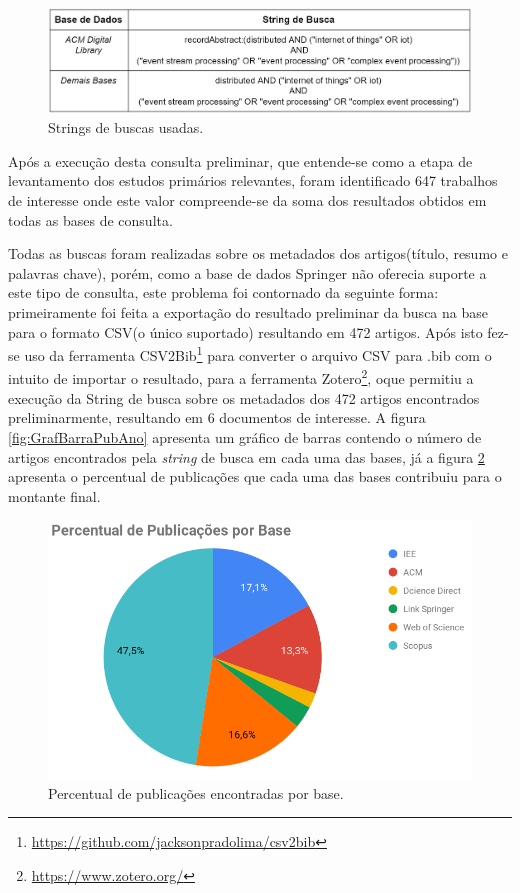 \documentclass[ti,table]{texufpel} %
\begin{document}
\begin{figure}[ht]
	\centering
	\includegraphics[width=1\textwidth]{imagens/tabela_string_busca.png}
	\caption{Strings de buscas usadas.}
	\label{tab:stringBusca}
\end{figure}

Após a execução desta consulta preliminar, que entende-se como a etapa de levantamento dos estudos primários relevantes, foram identificado 647 trabalhos de interesse onde este valor  compreende-se da soma dos resultados obtidos em todas as bases de consulta.

Todas as buscas foram realizadas sobre os metadados dos artigos(título, resumo e palavras chave), porém, como a base de dados Springer não oferecia suporte a este tipo de consulta, este problema foi contornado da seguinte forma: primeiramente foi feita a exportação do resultado preliminar da busca na base para o formato CSV(o único suportado) resultando em 472 artigos. Após isto fez-se uso da ferramenta CSV2Bib\footnote{\url{https://github.com/jacksonpradolima/csv2bib}} para converter o arquivo CSV para .bib com o intuito de importar o resultado, para a ferramenta Zotero\footnote{\url{https://www.zotero.org/}}, oque permitiu a execução da String de busca sobre os metadados dos 472 artigos encontrados preliminarmente, resultando em 6 documentos de interesse. A figura  \ref{fig:GrafBarraPubAno} apresenta um gráfico de barras contendo o número de artigos encontrados pela \textit{string} de busca em cada uma das bases, já a figura \ref{fig:GrafPizPubAno} apresenta o percentual de publicações que cada uma das bases contribuiu para o montante final.


\begin{figure}[ht]
	\centering
	\includegraphics[width=.9\textwidth]{imagens/GrafPizPubAno.png}
	\caption{Percentual de publicações encontradas por base.}
	\label{fig:GrafPizPubAno}
\end{figure}
\end{document}
